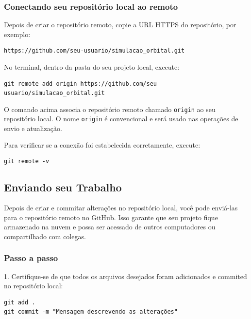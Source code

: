 \subsubsection*{Conectando seu repositório local ao remoto}

Depois de criar o repositório remoto, copie a URL HTTPS do repositório, por exemplo:

\begin{verbatim}
https://github.com/seu-usuario/simulacao_orbital.git
\end{verbatim}

No terminal, dentro da pasta do seu projeto local, execute:

\begin{lstlisting}[style=shellstyle]
git remote add origin https://github.com/seu-usuario/simulacao_orbital.git
\end{lstlisting}

\noindent
O comando acima associa o repositório remoto chamado \texttt{origin} ao seu repositório local. O nome \texttt{origin} é convencional e será usado nas operações de envio e atualização.

Para verificar se a conexão foi estabelecida corretamente, execute:

\begin{lstlisting}[style=shellstyle]
git remote -v
\end{lstlisting}


\subsection{Enviando seu Trabalho}

Depois de criar e commitar alterações no repositório local, você pode enviá-las para o repositório remoto no GitHub. Isso garante que seu projeto fique armazenado na nuvem e possa ser acessado de outros computadores ou compartilhado com colegas.

\subsubsection*{Passo a passo}

1. Certifique-se de que todos os arquivos desejados foram adicionados e commited no repositório local:

\begin{lstlisting}[style=shellstyle]
git add .
git commit -m "Mensagem descrevendo as alterações"
\end{lstlisting}

